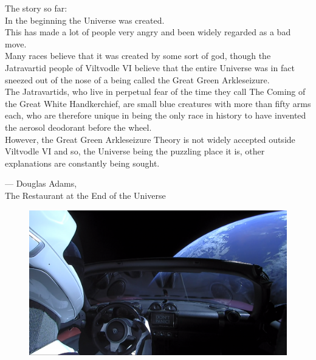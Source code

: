 \documentclass{article}
\begin{document}
\epigraph
{The story so far: \\
\hfill \break
In the beginning the Universe was created. \\
\hfill \break
This has made a lot of people very angry and been widely regarded
as a bad move. \\
\hfill \break
Many races believe that it was created by some sort of god,
though the Jatravartid people of Viltvodle VI believe that the
entire Universe was in fact sneezed out of the nose of a being
called the Great Green Arkleseizure. \\
\hfill \break
The Jatravartids, who live in perpetual fear of the time they
call The Coming of the Great White Handkerchief, are small blue
creatures with more than fifty arms each, who are therefore
unique in being the only race in history to have invented the
aerosol deodorant before the wheel. \\
\hfill \break
However, the Great Green Arkleseizure Theory is not widely
accepted outside Viltvodle VI and so, the Universe being the
puzzling place it is, other explanations are constantly being
sought.}
{--- \textup{Douglas Adams},\\ The Restaurant at the End of the Universe}

\begin{figure}[h] \centering
    \includegraphics[width=\textwidth]{dont-panic-elon-musk-tesla} %
\end{figure}
\end{document}
